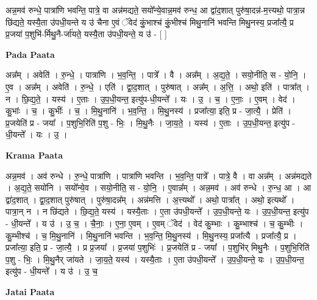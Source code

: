 \documentclass[17pt]{extarticle}
\begin{document}
अन्न॒मव॑ रुन्धे॒ पात्रा॑णि भवन्ति॒ पात्रे॒ वा अन्न॑मद्यते॒ सयो᳚न्ये॒वान्न॒मव॑ रुन्ध॒ आ द्वा॑द॒शात् पुरु॑षा॒दन्न॑-म॒त्त्यथो॒ पात्रा॒न्न छि॑द्यते॒ यस्यै॒ता उ॑पधी॒यन्ते य उ॑ चैना ए॒वं ॅवेद॑ कुं॒भाश्च॑ कुं॒भीश्च॑ मिथु॒नानि॑ भवन्ति मिथु॒नस्य॒ प्रजा᳚त्यै॒ प्र प्र॒जया॑ प॒शुभि॑-र्मिथु॒नै-र्जा॑यते॒ यस्यै॒ता उ॑पधी॒यन्ते॒ य उ॑ - [  ] \newline

\textbf{Pada Paata} \newline

अन्न᳚म् । अवेति॑ । रु॒न्धे॒ । पात्रा॑णि । भ॒व॒न्ति॒ । पात्रे᳚ । वै । अन्न᳚म् । अ॒द्य॒ते॒ । सयो॒नीति॒ स - यो॒नि॒ । ए॒व । अन्न᳚म् । अवेति॑ । रु॒न्धे॒ । एति॑ । द्वा॒द॒शात् । पुरु॑षात् । अन्न᳚म् । अ॒त्ति॒ । अथो॒ इति॑ । पात्रा᳚त् । न । छि॒द्य॒ते॒ । यस्य॑ । ए॒ताः । उ॒प॒धी॒यन्त॒ इत्यु॑प-धी॒यन्ते᳚ । यः । उ॒ । च॒ । ए॒नाः॒ । ए॒वम् । वेद॑ । कु॒भांः । च॒ । कु॒भींः । च॒ । मि॒थु॒नानि॑ । भ॒व॒न्ति॒ । मि॒थु॒नस्य॑ । प्रजा᳚त्या॒ इति॒ प्र - जा॒त्यै॒ । प्रेति॑ । प्र॒जयेति॑ प्र - जया᳚ । प॒शुभि॒रिति॑ प॒शु - भिः॒ । मि॒थु॒नैः । जा॒य॒ते॒ । यस्य॑ । ए॒ताः । उ॒प॒धी॒यन्त॒ इत्यु॑प - धी॒यन्ते᳚ । यः । उ॒ ।  \newline


\textbf{Krama Paata} \newline

अन्न॒मव॑ । अव॑ रुन्धे । रु॒न्धे॒ पात्रा॑णि । पात्रा॑णि भवन्ति । भ॒व॒न्ति॒ पात्रे᳚ । पात्रे॒ वै । वा अन्न᳚म् । अन्न॑मद्यते । अ॒द्य॒ते॒ सयो॑नि । सयो᳚न्ये॒व । सयो॒नीति॒ स - यो॒नि॒ । ए॒वान्न᳚म् । अन्न॒मव॑ । 
अव॑ रुन्धे । रु॒न्ध॒ आ । आ द्वा॑द॒शात् । द्वा॒द॒शात् पुरु॑षात् । पुरु॑षा॒दन्न᳚म् । अन्न॑मत्ति । अ॒त्त्यथो᳚ । अथो॒ पात्रा᳚त् । अथो॒ इत्यथो᳚ । पात्रा॒न् न । न छि॑द्यते । छि॒द्य॒ते॒ यस्य॑ । यस्यै॒ताः । ए॒ता उ॑पधी॒यन्ते᳚ । उ॒प॒धी॒यन्ते॒ यः । उ॒प॒धी॒यन्त॒ इत्यु॑प - धी॒यन्ते᳚ । य उ॑ । उ॒ च॒ । चै॒नाः॒ । ए॒ना॒ ए॒वम् । ए॒वम् ॅवेद॑ । वेद॑ कु॒म्भाः । कु॒म्भाश्च॑ । च॒ कु॒म्भीः । कु॒म्भीश्च॑ । च॒ मि॒थु॒नानि॑ । मि॒थु॒नानि॑ भवन्ति । भ॒व॒न्ति॒ मि॒थु॒नस्य॑ । मि॒थु॒नस्य॒ प्रजा᳚त्यै । प्रजा᳚त्यै॒ प्र । प्रजा᳚त्या॒ इति॒ प्र - जा॒त्यै॒ । प्र प्र॒जया᳚ । प्र॒जया॑ प॒शुभिः॑ । प्र॒जयेति॑ प्र - जया᳚ । प॒शुभि॑र् मिथु॒नैः । प॒शुभि॒रिति॑ प॒शु - भिः॒ । मि॒थु॒नैर् जा॑यते । जा॒य॒ते॒ यस्य॑ । यस्यै॒ताः । ए॒ता उ॑पधी॒यन्ते᳚ । उ॒प॒धी॒यन्ते॒ यः । उ॒प॒धी॒यन्त॒ इत्यु॑प - धी॒यन्ते᳚ । य उ॑ । उ॒ च॒ \newline

\textbf{Jatai Paata} \newline
\end{document}
